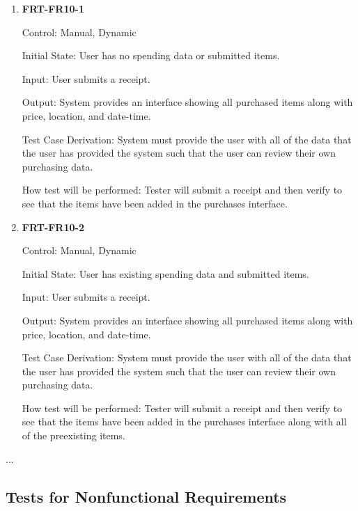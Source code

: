 \documentclass[12pt, titlepage]{article}
\begin{document}
\begin{enumerate}

\item{\textbf{FRT-FR10-1}}

Control: Manual, Dynamic
          
Initial State: User has no spending data or submitted items.

Input: User submits a receipt.
          
Output: System provides an interface showing all purchased items along with price, location, and date-time.

Test Case Derivation: System must provide the user with all of the data that the user has provided the system such that the user can review their own purchasing data.
          
How test will be performed: Tester will submit a receipt and then verify to see that the items have been added in the purchases interface.

\item{\textbf{FRT-FR10-2}}

Control: Manual, Dynamic
          
Initial State: User has existing spending data and submitted items.

Input: User submits a receipt.
          
Output: System provides an interface showing all purchased items along with price, location, and date-time.

Test Case Derivation: System must provide the user with all of the data that the user has provided the system such that the user can review their own purchasing data.
          
How test will be performed: Tester will submit a receipt and then verify to see that the items have been added in the purchases interface along with all of the preexisting items.

\end{enumerate}

...

\subsection{Tests for Nonfunctional Requirements}

\end{document}
